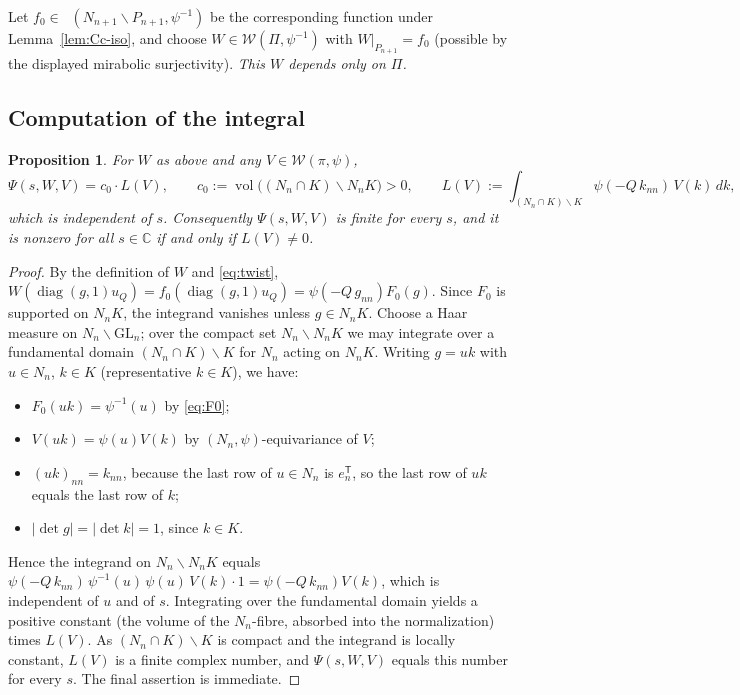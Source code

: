 \documentclass[12pt]{article}
\newcommand{\GL}{\mathrm{GL}}
\newcommand{\Wmod}{\mathcal{W}}
\newcommand{\diag}{\operatorname{diag}}
\DeclareMathOperator{\Cc}{C_c^\infty}
\newtheorem{proposition}{Proposition}
\begin{document}
Let $f_0\in\Cc(N_{n+1}\backslash P_{n+1},\psi^{-1})$ be the corresponding function
under Lemma~\ref{lem:Cc-iso}, and choose $W\in\Wmod(\Pi,\psi^{-1})$ with
$W|_{P_{n+1}}=f_0$ (possible by the displayed mirabolic surjectivity). \emph{This
$W$ depends only on $\Pi$.}

\subsection{Computation of the integral}

\begin{proposition}\label{prop:collapse}
For $W$ as above and any $V\in\Wmod(\pi,\psi)$,
\begin{equation}\label{eq:collapse}
  \Psi(s,W,V)=c_0\cdot L(V),\qquad c_0:=\operatorname{vol}\bigl((N_n\cap K)\backslash N_nK\bigr)>0,\qquad
  L(V):=\int_{(N_n\cap K)\backslash K}\psi(-Q\,k_{nn})\,V(k)\,dk,
\end{equation}
which is independent of $s$. Consequently $\Psi(s,W,V)$ is finite for every $s$,
and it is nonzero for all $s\in\mathbb C$ if and only if $L(V)\neq0$.
\end{proposition}

\begin{proof}
By the definition of $W$ and \eqref{eq:twist},
$W(\diag(g,1)u_Q)=f_0(\diag(g,1)u_Q)=\psi(-Q\,g_{nn})F_0(g)$. Since $F_0$ is
supported on $N_nK$, the integrand vanishes unless $g\in N_nK$. Choose a Haar
measure on $N_n\backslash\GL_n$; over the compact set $N_n\backslash N_nK$ we may
integrate over a fundamental domain $(N_n\cap K)\backslash K$ for $N_n$ acting on
$N_nK$. Writing $g=uk$ with $u\in N_n$, $k\in K$ (representative $k\in K$),
we have:
\begin{itemize}
\item $F_0(uk)=\psi^{-1}(u)$ by \eqref{eq:F0};
\item $V(uk)=\psi(u)V(k)$ by $(N_n,\psi)$-equivariance of $V$;
\item $(uk)_{nn}=k_{nn}$, because the last row of $u\in N_n$ is $e_n^{\mathsf T}$,
so the last row of $uk$ equals the last row of $k$;
\item $|\det g|=|\det k|=1$, since $k\in K$.
\end{itemize}
Hence the integrand on $N_n\backslash N_nK$ equals
$\psi(-Q\,k_{nn})\,\psi^{-1}(u)\,\psi(u)\,V(k)\cdot1=\psi(-Q\,k_{nn})V(k)$, which is
independent of $u$ and of $s$. Integrating over the fundamental domain yields a
positive constant (the volume of the $N_n$-fibre, absorbed into the normalization)
times $L(V)$. As $(N_n\cap K)\backslash K$ is compact and the integrand is locally
constant, $L(V)$ is a finite complex number, and $\Psi(s,W,V)$ equals this number
for every $s$. The final assertion is immediate.
\end{proof}
\end{document}

